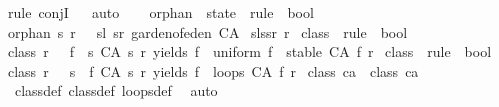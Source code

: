 \begin{isabellebody}
{\isacharparenleft}rule\ conjI{\isacharparenright}\isanewline
\ \ \isamarkupfalse%
{\isacharparenleft}auto{\isacharparenright}\isanewline
\ \ \isamarkupfalse%
%
\endisatagproof
{\isafoldproof}%
%
\isadelimproof
\isanewline
%
\endisadelimproof
\isanewline
\isanewline
{}\isamarkupfalse%
\ orphan\ {\isacharcolon}{\isacharcolon}\ {\isachardoublequoteopen}state\ {\isasymRightarrow}\ rule\ {\isasymRightarrow}\ bool{\isachardoublequoteclose}\ \isanewline
{\isachardoublequoteopen}orphan\ s{}\ r\ {\isacharequal}\ {\isacharparenleft}{\isasymforall}\ sl\ sr{\isachardot}\ garden{\isacharunderscore}of{\isacharunderscore}eden\ {\isacharparenleft}CA\ {\isacharparenleft}\isanewline
sl{\isacharat}s{}{\isacharat}sr{\isacharparenright}\ r{\isacharparenright}{\isacharparenright}{\isachardoublequoteclose}\isanewline
\isanewline
\isanewline
\isanewline
\isanewline
\isanewline
{}\isamarkupfalse%
\ class{}\ {\isacharcolon}{\isacharcolon}\ {\isachardoublequoteopen}rule\ {\isasymRightarrow}\ bool{\isachardoublequoteclose}\ \isanewline
{\isachardoublequoteopen}class{}\ r\ {\isasymequiv}\ {\isacharparenleft}{\isasymexists}{\isacharbang}\ f{\isachardot}\ {\isacharparenleft}{\isasymforall}\ s{\isachardot}\ {\isacharparenleft}CA\ s\ r{\isacharparenright}\ yields\ f\ {\isasymand}\ uniform\ f\ {\isasymand}\ stable\ {\isacharparenleft}CA\ f\ r{\isacharparenright}{\isacharparenright}{\isacharparenright}{\isachardoublequoteclose}\isanewline
\isanewline
{}\isamarkupfalse%
\ class{}\ {\isacharcolon}{\isacharcolon}\ {\isachardoublequoteopen}rule\ {\isasymRightarrow}\ bool{\isachardoublequoteclose}\ \isanewline
{\isachardoublequoteopen}class{}\ r\ {\isasymequiv}\ {\isacharparenleft}{\isasymforall}\ s{\isachardot}\ {\isacharparenleft}{\isasymexists}\ f{\isachardot}\ {\isacharparenleft}CA\ s\ r{\isacharparenright}\ yields\ f\ {\isasymand}\ loops\ {\isacharparenleft}CA\ f\ r{\isacharparenright}{\isacharparenright}{\isacharparenright}{\isachardoublequoteclose}\isanewline
\isanewline
{}\isamarkupfalse%
\ {\isachardoublequoteopen}class{}\ ca\ {\isasymLongrightarrow}\ class{}\ ca{\isachardoublequoteclose}\isanewline
%
\isadelimproof
\ \ %
\endisadelimproof
%
\isatagproof
{}\isamarkupfalse%
\ class{}{\isacharunderscore}def\ class{}{\isacharunderscore}def\ loops{\isacharunderscore}def\ \isamarkupfalse%
\ auto%
\endisatagproof
{\isafoldproof}%
%
\isadelimproof
\isanewline
%
\endisadelimproof
%
\isadelimtheory
%
\endisadelimtheory
%
\isatagtheory
{}\isamarkupfalse%
%
\endisatagtheory
{\isafoldtheory}%
%
\isadelimtheory
%
\endisadelimtheory
%
\end{isabellebody}%
